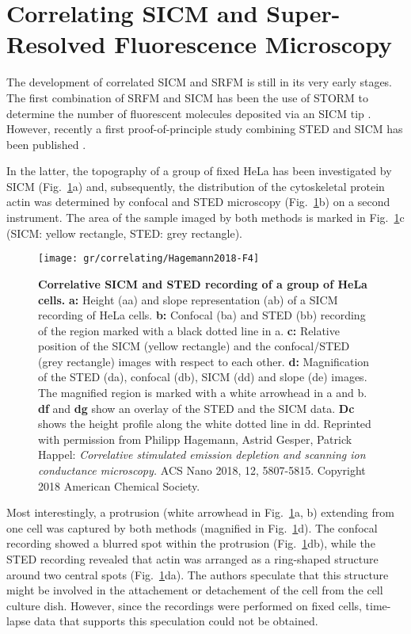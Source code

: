 \section{Correlating SICM and Super-Resolved Fluorescence Microscopy}
\label{sec:correlating-sicm-and-srfm}

The development of correlated
SICM and SRFM is still in its very early stages. The first combination of SRFM
and SICM has been the use of STORM to determine the number of fluorescent
molecules deposited via an SICM tip \cite{Hennig2015}. However, recently a
first proof-of-principle study combining STED and SICM has been published
\cite{Hagemann2018}.

In the latter, the topography of a group of fixed HeLa has been investigated
by SICM (Fig.~\ref{fig:SICM_STED1}a) and, subsequently, the distribution of
the cytoskeletal protein actin was determined by confocal and STED microscopy
(Fig.~\ref{fig:SICM_STED1}b) on a second instrument. The area of the sample
imaged by both methods is marked in Fig.~\ref{fig:SICM_STED1}c (SICM: yellow
rectangle, STED: grey rectangle).



\begin{figure}	
  \centering
    \texttt{[image: gr/correlating/Hagemann2018-F4]}
      \caption{
      \textbf{Correlative SICM and STED recording of a group of HeLa cells.} 
      \textbf{a:} Height (aa) and slope representation (ab) of a SICM recording
      of HeLa cells. \textbf{b:} Confocal (ba) and STED (bb) recording of the
      region marked  
      with a black dotted line in a. \textbf{c:}  Relative position of 
      the SICM (yellow rectangle) and the confocal/STED (grey rectangle)
      images with respect to each 
      other. \textbf{d:} Magnification of the STED (da), confocal (db), SICM
      (dd) and slope (de) images. The magnified region is marked with a white 
      arrowhead in a and b. \textbf{df} and \textbf{dg} show an overlay of 
      the STED and the SICM data. 
      \textbf{Dc} shows the height profile along the white dotted line in dd.  Reprinted 
      with permission from Philipp Hagemann, Astrid Gesper, Patrick Happel: \emph{Correlative 
      stimulated emission depletion and scanning ion conductance microscopy.} ACS Nano 2018, 
      12, 5807-5815. Copyright 2018 American Chemical Society.}
  \label{fig:SICM_STED1}
\end{figure}

Most interestingly, a protrusion (white arrowhead in
Fig.~\ref{fig:SICM_STED1}a, b) extending from one cell was captured by both
methods (magnified in Fig.~\ref{fig:SICM_STED1}d). The confocal recording
showed a blurred spot within the protrusion (Fig.~\ref{fig:SICM_STED1}db),
while the STED recording revealed that actin was arranged as a ring-shaped
structure around two central spots (Fig.~\ref{fig:SICM_STED1}da). The authors
speculate that this structure might be involved in the attachement or
detachement of the cell from the cell culture dish. However, since the
recordings were performed on fixed cells, time-lapse data that supports this
speculation could not be obtained.

